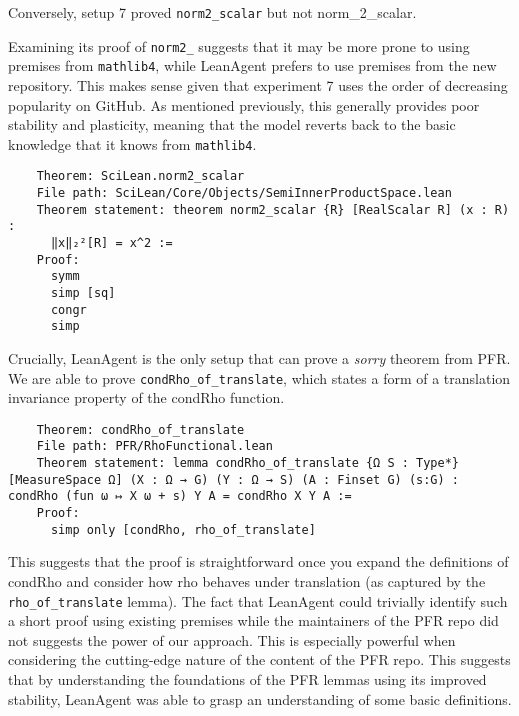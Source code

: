 \documentclass{article} %
\begin{document}
Conversely, setup 7 proved \texttt{norm2\_scalar} but not norm_{2}\_scalar. 

Examining its proof of \texttt{norm2\_} suggests that it may be more prone to using premises from \texttt{mathlib4}, while LeanAgent prefers to use premises from the new repository. This makes sense given that experiment 7 uses the order of decreasing popularity on GitHub. As mentioned previously, this generally provides poor stability and plasticity, meaning that the model reverts back to the basic knowledge that it knows from \texttt{mathlib4}.

\begin{verbatim}
    Theorem: SciLean.norm2_scalar
    File path: SciLean/Core/Objects/SemiInnerProductSpace.lean
    Theorem statement: theorem norm2_scalar {R} [RealScalar R] (x : R) :
      ‖x‖₂²[R] = x^2 :=
    Proof:
      symm
      simp [sq]
      congr
      simp
\end{verbatim}







Crucially, LeanAgent is the only setup that can prove a \textit{sorry} theorem from PFR. We are able to prove \texttt{condRho\_of\_translate}, which states a form of a translation invariance property of the condRho function.

\begin{verbatim}
    Theorem: condRho_of_translate
    File path: PFR/RhoFunctional.lean
    Theorem statement: lemma condRho_of_translate {Ω S : Type*} [MeasureSpace Ω] (X : Ω → G) (Y : Ω → S) (A : Finset G) (s:G) : condRho (fun ω ↦ X ω + s) Y A = condRho X Y A :=
    Proof:
      simp only [condRho, rho_of_translate]
\end{verbatim}

This suggests that the proof is straightforward once you expand the definitions of condRho and consider how rho behaves under translation (as captured by the \texttt{rho\_of\_translate} lemma). The fact that LeanAgent could trivially identify such a short proof using existing premises while the maintainers of the PFR repo did not suggests the power of our approach. This is especially powerful when considering the cutting-edge nature of the content of the PFR repo. This suggests that by understanding the foundations of the PFR lemmas using its improved stability, LeanAgent was able to grasp an understanding of some basic definitions.
\end{document}
